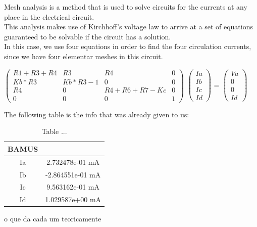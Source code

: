 Mesh analysis is a method that is used to solve circuits for the currents at any place in the electrical circuit.\\
This analysis makes use of Kirchhoff’s voltage law to arrive at a set of equations guaranteed to be solvable if the circuit has a solution.\\In this case, we use four equations in order to find the four circulation currents, since we have four elementar meshes in this circuit.

$\begin{pmatrix}
R1+R3+R4 & R3 & R4 & 0 \\
Kb*R3 & Kb*R3 - 1 & 0 & 0 \\
R4 & 0 & R4+R6+R7-Kc & 0 \\
0 & 0 & 0 & 1 
\end{pmatrix}$
$\begin{pmatrix}
Ia\\
Ib\\
Ic\\
Id
\end{pmatrix}$
=
$\begin{pmatrix}
Va\\
0\\
0\\
Id
\end{pmatrix}$


The following table is the info that was already given to us:

\begin{table}[ht]
\centering
\begin{tabular}{c|c} 
 \hline
 BAMUS\\ [0.5ex] 
 \hline\hline
Ia & 2.732478e-01 mA\\ \hline
Ib & -2.864551e-01 mA\\ \hline
Ic & 9.563162e-01 mA\\ \hline
Id & 1.029587e+00 mA\\ \hline 
\end{tabular}
\caption{Table ...}
\label{table:3}
\end{table}


o que da cada um teoricamente















